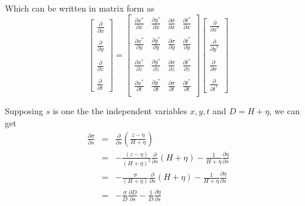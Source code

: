 \documentclass[oribibl]{llncs}
\begin{document}
Which can be written in matrix form as
\begin{equation}      
\left[                 
  \begin{array}{c}  
    \frac{\partial}{\partial x}  \\  \nonumber \\ 
    \frac{\partial}{\partial y}  \\ \nonumber \\ 
    \frac{\partial}{\partial z}  \\ \nonumber \\ 
    \frac{\partial}{\partial t} 
  \end{array}
\right]
=  
\left[             
  \begin{array}{cccc}  
    \frac{\partial x^*}{\partial x} & \frac{\partial y^*}{\partial x} & \frac{\partial \sigma}{\partial x} & \frac{\partial t^*}{\partial x}\\   \nonumber \\ 
    \frac{\partial x^*}{\partial y} & \frac{\partial y^*}{\partial y} & \frac{\partial \sigma}{\partial y} & \frac{\partial t^*}{\partial y}\\   \nonumber \\ 
    \frac{\partial x^*}{\partial z} & \frac{\partial y^*}{\partial z} & \frac{\partial \sigma}{\partial z} & \frac{\partial t^*}{\partial z}\\   \nonumber \\ 
    \frac{\partial x^*}{\partial t} & \frac{\partial y^*}{\partial t} & \frac{\partial \sigma}{\partial t} & \frac{\partial t^*}{\partial t}\\  
  \end{array}
\right]              
\left[                 
  \begin{array}{c}  
    \frac{\partial}{\partial x^*}  \\  \nonumber \\ 
    \frac{\partial}{\partial y^*}  \\ \nonumber \\ 
    \frac{\partial}{\partial \sigma}  \\ \nonumber \\ 
    \frac{\partial}{\partial t^*} 
  \end{array}
\right]
\end{equation}

Supposing $s$ is one the the independent variables $x,y,t$ and $D=H+\eta$, we can get
\begin{eqnarray}
\frac{\partial \sigma}{\partial s} &=& \frac{\partial }{\partial s}\left( \frac{z-\eta}{H+\eta} \right)  \nonumber\\
&=& -\frac{(z-\eta)}{(H+\eta)^2 }\frac{\partial}{\partial s}(H+\eta) - \frac{1}{H+\eta}\frac{\partial \eta}{\partial s} \nonumber\\
&=& -\frac{\sigma}{(H+\eta)}\frac{\partial}{\partial s}(H+\eta) - \frac{1}{H+\eta}\frac{\partial \eta}{\partial s} \nonumber\\
&=& -\frac{\sigma}{D}\frac{\partial D}{\partial s} - \frac{1}{D}\frac{\partial \eta}{\partial s}
\end{eqnarray}
\end{document}
